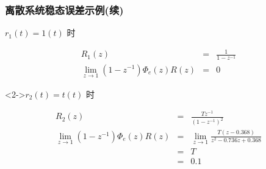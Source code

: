 \documentclass[table]{beamer}
\begin{document}
\begin{frame}
\frametitle{离散系统稳态误差示例(续)}
\label{sec-1-3}
\begin{block}{$r_1(t) =  1(t)$ 时}
\label{sec-1-3-1}

     \begin{eqnarray*}
     R_1(z) &=& \frac{1}{1-z^{-1}} \\
     \lim_{z\rightarrow 1}(1-z^{-1})\Phi_e(z)R(z) &=& 0
     \end{eqnarray*}
\end{block}
\begin{block}<2->{$r_2(t) = t(t)$ 时}
\label{sec-1-3-2}

     \begin{eqnarray*}
     R_2(z) &=& \frac{Tz^{-1}}{(1-z^{-1})^2} \\
     \lim_{z\rightarrow 1}(1-z^{-1})\Phi_e(z)R(z) &=& \lim_{z\rightarrow 1}\frac{T(z-0.368)}{z^2-0.736z+0.368}\\
      &=& T \\
      &=& 0.1
     \end{eqnarray*}
\end{block}
\end{frame}
\end{document}
